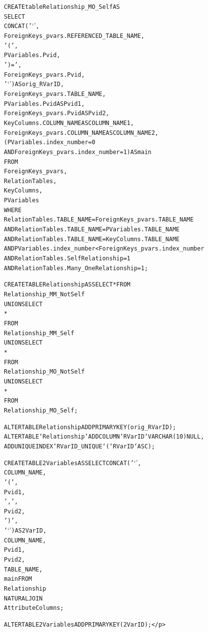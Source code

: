\documentclass{acm_proc_article-sp}
\begin{document}
\begin{appendix}
\begin{scriptsize}
\begin{alltt}
CREATE table Relationship_MO_Self AS
SELECT 
    CONCAT('`',
            ForeignKeys_pvars.REFERENCED_TABLE_NAME,
            '(',
            PVariables.Pvid,
            ')=',
            ForeignKeys_pvars.Pvid,
            '`') AS orig_RVarID,
    ForeignKeys_pvars.TABLE_NAME,
    PVariables.Pvid AS Pvid1,
    ForeignKeys_pvars.Pvid AS Pvid2,
    KeyColumns.COLUMN_NAME AS COLUMN_NAME1,
    ForeignKeys_pvars.COLUMN_NAME AS COLUMN_NAME2,
    (PVariables.index_number = 0
        AND ForeignKeys_pvars.index_number = 1) AS main
FROM
    ForeignKeys_pvars,
    RelationTables,
    KeyColumns,
    PVariables
WHERE
    RelationTables.TABLE_NAME = ForeignKeys_pvars.TABLE_NAME
        AND RelationTables.TABLE_NAME = PVariables.TABLE_NAME
        AND RelationTables.TABLE_NAME = KeyColumns.TABLE_NAME
        AND PVariables.index_number < ForeignKeys_pvars.index_number
        AND RelationTables.SelfRelationship = 1
        AND RelationTables.Many_OneRelationship = 1;

CREATE TABLE Relationship AS SELECT * FROM  
Relationship_MM_NotSelf    
UNION SELECT            
*                   
FROM
Relationship_MM_Self 
UNION SELECT 
*
FROM
Relationship_MO_NotSelf 
UNION SELECT 
*
FROM
Relationship_MO_Self;

ALTER TABLE Relationship ADD PRIMARY KEY (orig_RVarID);
ALTER TABLE `Relationship` ADD COLUMN `RVarID` VARCHAR(10) NULL , 
ADD UNIQUE INDEX `RVarID_UNIQUE` (`RVarID` ASC) ; 


CREATE TABLE 2Variables AS SELECT CONCAT('`',
        COLUMN_NAME,
        '(',
        Pvid1,
        ',',
        Pvid2,
        ')',
        '`') AS 2VarID,
COLUMN_NAME,
Pvid1,
Pvid2,
TABLE_NAME,
main FROM
Relationship
    NATURAL JOIN
AttributeColumns;

ALTER TABLE 2Variables ADD PRIMARY KEY (2VarID);</p>\end{alltt}

%
%
\end{scriptsize}

\end{appendix}
\end{document}
